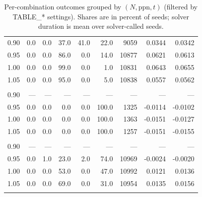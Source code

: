 \begin{table}[t]
\begin{tabular}{r r r r r r r r r}
\midrule
0.90 & 0.0 & 0.0 & 37.0 & 41.0 & 22.0 & 9059 & 0.0344 & 0.0342 \\
0.95 & 0.0 & 0.0 & 86.0 & 0.0 & 14.0 & 10877 & 0.0621 & 0.0613 \\
1.00 & 0.0 & 0.0 & 99.0 & 0.0 & 1.0 & 10831 & 0.0643 & 0.0655 \\
1.05 & 0.0 & 0.0 & 95.0 & 0.0 & 5.0 & 10838 & 0.0557 & 0.0562 \\
\addlinespace[0.35em]
\multicolumn{9}{l}{$N=32$, $\mathrm{ppn}=8$, $t=1\,\mathrm{s}$} \\
\midrule
0.90 & — & — & — & — & — & — & — & — \\
0.95 & 0.0 & 0.0 & 0.0 & 0.0 & 100.0 & 1325 & -0.0114 & -0.0102 \\
1.00 & 0.0 & 0.0 & 0.0 & 0.0 & 100.0 & 1363 & -0.0151 & -0.0127 \\
1.05 & 0.0 & 0.0 & 0.0 & 0.0 & 100.0 & 1257 & -0.0151 & -0.0155 \\
\addlinespace[0.35em]
\multicolumn{9}{l}{$N=32$, $\mathrm{ppn}=8$, $t=10\,\mathrm{s}$} \\
\midrule
0.90 & — & — & — & — & — & — & — & — \\
0.95 & 0.0 & 1.0 & 23.0 & 2.0 & 74.0 & 10969 & -0.0024 & -0.0020 \\
1.00 & 0.0 & 0.0 & 53.0 & 0.0 & 47.0 & 10992 & 0.0121 & 0.0136 \\
1.05 & 0.0 & 0.0 & 69.0 & 0.0 & 31.0 & 10954 & 0.0135 & 0.0156 \\
\addlinespace[0.35em]
\bottomrule
\end{tabular}
\caption{Per-combination outcomes grouped by $(N,\mathrm{ppn},t)$ (filtered by TABLE\_* settings). Shares are in percent of seeds; solver duration is mean over solver-called seeds.}
\label{tab:kwok-workload-once-kmax2}
\end{table}
